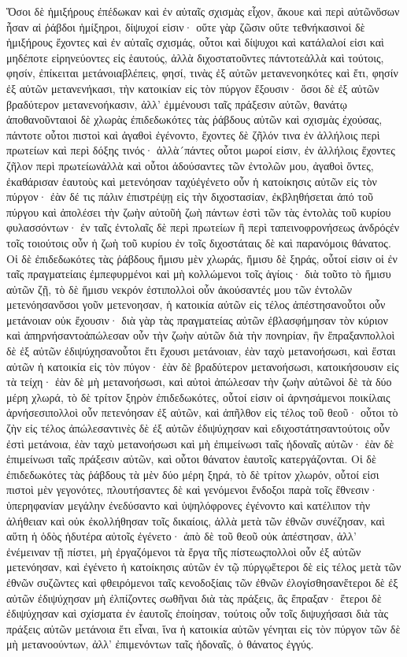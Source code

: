 Ὅσοι δὲ ἡμιξήρους ἐπέδωκαν καὶ ἐν αὐταῖς σχισμὰς εἶχον, ἄκουε καὶ περὶ αὐτῶνὅσων ἦσαν αἱ ῥάβδοι ἡμίξηροι, δίψυχοί εἰσιν· οὔτε γὰρ ζῶσιν οὔτε τεθνήκασινοἱ δὲ ἡμιξήρους ἔχοντες καὶ ἐν αὐταῖς σχισμάς, οὗτοι καὶ δίψυχοι καὶ κατάλαλοί εἰσι καὶ μηδέποτε εἰρηνεύοντες εἰς ἑαυτούς, ἀλλὰ διχοστατοῦντες πάντοτεἀλλὰ καὶ τούτοις, φησίν, ἐπίκειται μετάνοιαβλέπεις, φησί, τινὰς ἐξ αὐτῶν μετανενοηκότες καὶ ἔτι, φησίν ἐξ αὐτῶν μετανενήκασι, τὴν κατοικίαν εἰς τὸν πύργον ἔξουσιν· ὅσοι δὲ ἐξ αὐτῶν βραδύτερον μετανενοήκασιν, ἀλλ’ ἐμμένουσι ταῖς πράξεσιν αὐτῶν, θανάτῳ ἀποθανοῦνταιοἱ δὲ χλωρὰς ἐπιδεδωκότες τὰς ῥάβδους αὐτῶν καὶ σχισμὰς ἐχούσας, πάντοτε οὗτοι πιστοὶ καὶ ἀγαθοὶ ἐγένοντο, ἔχοντες δὲ ζῆλόν τινα ἐν ἀλλήλοις περὶ πρωτείων καὶ περὶ δόξης τινός· ἀλλὰ´πάντες οὗτοι μωροί εἰσιν, ἐν ἀλλήλοις ἔχοντες ζῆλον περὶ πρωτείωνἀλλὰ καὶ οὗτοι ἀδούσαντες τῶν ἐντολῶν μου, ἀγαθοὶ ὄντες, ἐκαθάρισαν ἑαυτοὺς καὶ μετενόησαν ταχύἐγένετο οὖν ἡ κατοίκησις αὐτῶν εἰς τὸν πύργον· ἐὰν δέ τις πάλιν ἐπιστρέψῃ εἰς τὴν διχοστασίαν, ἐκβληθήσεται ἀπό τοῦ πύργου καὶ ἀπολέσει τὴν ζωὴν αὐτοῦἡ ζωὴ πάντων ἐστὶ τῶν τὰς ἐντολὰς τοῦ κυρίου φυλασσόντων· ἐν ταῖς ἐντολαῖς δὲ περὶ πρωτείων ἢ περὶ ταπεινοφρονήσεως ἀνδρόςἐν τοῖς τοιούτοις οὖν ἡ ζωὴ τοῦ κυρίου ἐν τοῖς διχοστάταις δὲ καὶ παρανόμοις θάνατος.
Οἱ δὲ ἐπιδεδωκότες τὰς ῥάβδους ἥμισυ μὲν χλωράς, ἥμισυ δὲ ξηράς, οὗτοί εἰσιν οἱ ἐν ταῖς πραγματείαις ἐμπεφυρμένοι καὶ μὴ κολλώμενοι τοῖς ἁγίοις· διὰ τοῦτο τὸ ἥμισυ αὐτῶν ζῇ, τὸ δὲ ἥμισυ νεκρόν ἐστιπολλοὶ οὖν ἀκούσαντές μου τῶν ἐντολῶν μετενόησανὅσοι γοῦν μετενοησαν, ἡ κατοικία αὐτῶν εἰς τέλος ἀπέστησανοὗτοι οὖν μετάνοιαν οὐκ ἔχουσιν· διὰ γὰρ τὰς πραγματείας αὐτῶν ἐβλασφήμησαν τὸν κύριον καὶ ἀπηρνήσαντοἀπώλεσαν οὖν τὴν ζωὴν αὐτῶν διὰ τὴν πονηρίαν, ἣν ἔπραξανπολλοὶ δὲ ἐξ αὐτῶν ἐδιψύχησανοὗτοι ἔτι ἔχουσι μετάνοιαν, ἐὰν ταχὺ μετανοήσωσι, καὶ ἔσται αὐτῶν ἡ κατοικία εἰς τὸν πύγον· ἐὰν δὲ βραδύτερον μετανοήσωσι, κατοικήσουσιν εἰς τὰ τείχη· ἐὰν δὲ μὴ μετανοήσωσι, καὶ αὐτοὶ ἀπώλεσαν τὴν ζωὴν αὐτῶνοἱ δὲ τὰ δύο μέρη χλωρά, τὸ δὲ τρίτον ξηρὸν ἐπιδεδωκότες, οὗτοί εἰσιν οἱ ἀρνησάμενοι ποικίλαις ἀρνήσεσιπολλοὶ οὖν πετενόησαν ἐξ αὐτῶν, καὶ ἀπῆλθον εἰς τέλος τοῦ θεοῦ· οὗτοι τὸ ζὴν εἰς τέλος ἀπώλεσαντινὲς δὲ ἐξ αὐτῶν ἐδιψύχησαν καὶ εδιχοστάτησαντούτοις οὖν ἐστὶ μετάνοια, ἐὰν ταχὺ μετανοήσωσι καὶ μὴ ἐπιμείνωσι ταῖς ἡδοναῖς αὐτῶν· ἐὰν δὲ ἐπιμείνωσι ταῖς πράξεσιν αὐτῶν, καὶ οὗτοι θάνατον ἑαυτοῖς κατεργάζονται.
Οἱ δὲ ἐπιδεδωκότες τὰς ῥάβδους τὰ μὲν δύο μέρη ξηρά, τὸ δὲ τρίτον χλωρόν, οὗτοί εἰσι πιστοὶ μὲν γεγονότες, πλουτήσαντες δὲ καὶ γενόμενοι ἔνδοξοι παρὰ τοῖς ἔθνεσιν· ὑπερηφανίαν μεγάλην ἐνεδύσαντο καὶ ὑψηλόφρονες ἐγένοντο καὶ κατέλιπον τὴν ἀλήθειαν καὶ οὐκ ἐκολλήθησαν τοῖς δικαίοις, ἀλλὰ μετὰ τῶν ἐθνῶν συνέζησαν, καὶ αὕτη ἡ ὁδὸς ἡδυτέρα αὐτοῖς ἐγένετο· ἀπὸ δὲ τοῦ θεοῦ οὐκ ἀπέστησαν, ἀλλ’ ἐνέμειναν τῇ πίστει, μὴ ἐργαζόμενοι τὰ ἔργα τῆς πίστεωςπολλοὶ οὖν ἐξ αὐτῶν μετενόησαν, καὶ ἐγένετο ἡ κατοίκησις αὐτῶν ἐν τῷ πύργῳἕτεροι δὲ εἰς τέλος μετὰ τῶν ἐθνῶν συζῶντες καὶ φθειρόμενοι ταῖς κενοδοξίαις τῶν ἐθνῶν ἐλογίσθησανἕτεροι δὲ ἐξ αὐτῶν ἐδιψύχησαν μὴ ἐλπίζοντες σωθῆναι διὰ τὰς πράξεις, ἃς ἔπραξαν· ἕτεροι δὲ ἐδιψύχησαν καὶ σχίσματα ἐν ἑαυτοῖς ἐποίησαν, τούτοις οὖν τοῖς διψυχήσασι διὰ τὰς πράξεις αὐτῶν μετάνοια ἔτι εἶναι, ἵνα ἡ κατοικία αὐτῶν γένηται εἰς τὸν πύργον τῶν δὲ μὴ μετανοούντων, ἀλλ’ ἐπιμενόντων ταῖς ἡδοναῖς, ὁ θάνατος ἐγγύς.
